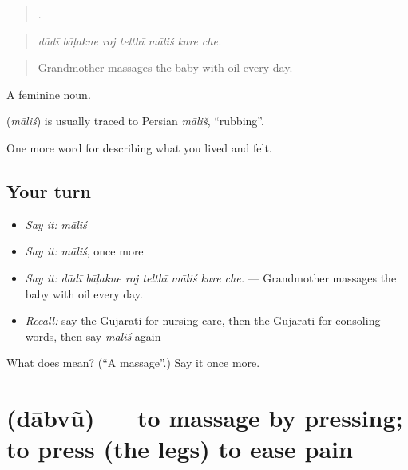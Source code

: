 \begin{quote}
      .
\end{quote}

\begin{quote}
\emph{dādī bāḷakne roj telthī māliś kare che.}
\end{quote}

\begin{quote}
Grandmother massages the baby with oil every day.
\end{quote}

A feminine noun.

\begin{cousinweb}
\textbf{} (\emph{māliś}) is usually traced to Persian \emph{māliš}, \textquotedblleft{}rubbing\textquotedblright{}.
\end{cousinweb}

\begin{grammarlens}[title={What you've built}]
One more word for describing what you lived and felt.
\end{grammarlens}

\subsection*{Your turn}
\begin{itemize}
\raggedright
  \item \emph{Say it:} \emph{māliś}
  \item \emph{Say it:} \emph{māliś}, once more
  \item \emph{Say it:} \emph{dādī bāḷakne roj telthī māliś kare che.} — Grandmother massages the baby with oil every day.
  \item \emph{Recall:} say the Gujarati for nursing care, then the Gujarati for consoling words, then say \emph{māliś} again
\end{itemize}

\begin{tcolorbox}[breakable,colback=teal!4,colframe=teal!35!black,title={Before you move on}]
What does  mean? (\textquotedblleft{}A massage\textquotedblright{}.) Say it once more.
\end{tcolorbox}
\section[\texorpdfstring{\gu{દાબવું} (dābvũ)}{દાબવું (dābvũ)}]{ (dābvũ) — to massage by pressing; to press (the legs) to ease pain}

